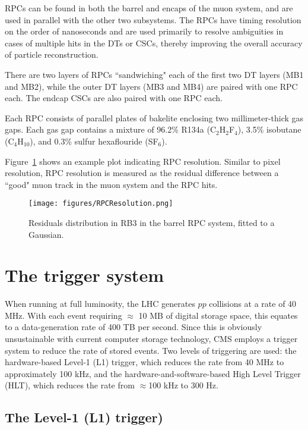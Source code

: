 RPCs can be found in both the barrel and encaps of the muon system, and are used in parallel with the other two subsystems. The RPCs have timing resolution on the order of nanoseconds and are used primarily to resolve ambiguities in cases of multiple hits in the DTs or CSCs, thereby improving the overall accuracy of particle reconstruction.

There are two layers of RPCs ``sandwiching" each of the first two DT layers (MB1 and MB2), while the outer DT layers (MB3 and MB4) are paired with one RPC each. The endcap CSCs are also paired with one RPC each. 

Each RPC consists of parallel plates of bakelite enclosing two millimeter-thick gas gaps. Each gas gap contains a mixture of 96.2\% R134a (C$_2$H$_2$F$_4$), 3.5\% isobutane (C$_4$H$_10$), and 0.3\% sulfur hexaflouride (SF$_6$).

Figure~\ref{fig:RPCResolution} shows an example plot indicating RPC resolution. Similar to pixel resolution, RPC resolution is measured as the residual difference between a ``good" muon track in the muon system and the RPC hits.\cite{Muon}

\begin{figure}\centering
  \texttt{[image: figures/RPCResolution.png]}
  \caption{\label{fig:RPCResolution} Residuals distribution in RB3 in the barrel RPC system, fitted to a Gaussian.}
\end{figure}


\section{The trigger system}

When running at full luminosity, the LHC generates $pp$ collisions at a rate of 40 MHz. With each event requiring $\approx$ 10 MB of digital storage space, this equates to a data-generation rate of 400 TB per second. Since this is obviously unsustainable with current computer storage technology, CMS employs a trigger system to reduce the rate of stored events. Two levels of triggering are used: the hardware-based Level-1 (L1) trigger, which reduces the rate from 40 MHz to approximately 100 kHz, and the hardware-and-software-based High Level Trigger (HLT), which reduces the rate from $\approx$100 kHz to 300 Hz.\cite{TDR}

\subsection{The Level-1 (L1) trigger)}

